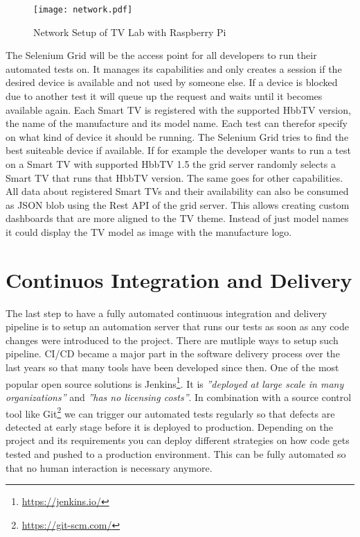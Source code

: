 \vspace{1cm}
\begin{figure}[htb]
  \centering
  \texttt{[image: network.pdf]}\\
  \caption{Network Setup of TV Lab with Raspberry Pi}\label{fig:network}
\end{figure}
\vspace{0.5cm}

The Selenium Grid will be the access point for all developers to run their automated tests on. It
manages its capabilities and only creates a session if the desired device is available and not used
by someone else. If a device is blocked due to another test it will queue up the request and waits
until it becomes available again. Each Smart TV is registered with the supported HbbTV version, the
name of the manufacture and its model name. Each test can therefor specify on what kind of device
it should be running. The Selenium Grid tries to find the best suiteable device if available. If for
example the developer wants to run a test on a Smart TV with supported HbbTV 1.5 the grid server
randomly selects a Smart TV that runs that HbbTV version. The same goes for other capabilities. All
data about registered Smart TVs and their availability can also be consumed as JSON blob using
the Rest API of the grid server. This allows creating custom dashboards that are more aligned to
the TV theme. Instead of just model names it could display the TV model as image with the manufacture
logo.

\section{Continuos Integration and Delivery\label{sec:cicd}}

The last step to have a fully automated continuous integration and delivery pipeline is to setup
an automation server that runs our tests as soon as any code changes were introduced to the project.
There are mutliple ways to setup such pipeline. CI/CD became a major part in the software delivery
process over the last years so that many tools have been developed since then. One of the most
popular open source solutions is Jenkins\footnote{\url{https://jenkins.io/}}. It is \textit{''deployed
at large scale in many organizations''}\cite{jenkins} and \textit{''has no licensing costs''}\cite{jenkins}.
In combination with a source control tool like Git\footnote{\url{https://git-scm.com/}} we can
trigger our automated tests regularly so that defects are detected at early stage before it is
deployed to production. Depending on the project and its requirements you can deploy different
strategies on how code gets tested and pushed to a production environment. This can be fully automated
so that no human interaction is necessary anymore.

